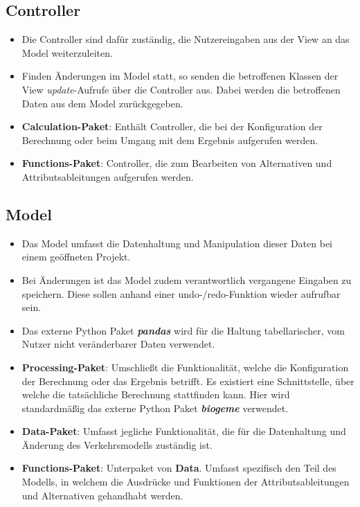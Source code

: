 \documentclass{article}
\begin{document}
\subsection{Controller}
\begin{itemize}
\item Die Controller sind dafür zuständig, die Nutzereingaben aus der View an das Model weiterzuleiten.
\item Finden Änderungen im Model statt, so senden die betroffenen Klassen der View \emph{update}-Aufrufe über die Controller aus. Dabei werden die betroffenen Daten aus dem Model zurückgegeben.
\item \textbf{Calculation-Paket}: Enthält Controller, die bei der Konfiguration der Berechnung oder beim Umgang mit dem Ergebnis aufgerufen werden.
\item \textbf{Functions-Paket}: Controller, die zum Bearbeiten von Alternativen und
Attributsableitungen aufgerufen werden.
\end{itemize}

\subsection{Model}
\begin{itemize}
\item Das Model umfasst die Datenhaltung und Manipulation dieser Daten bei einem geöffneten Projekt.
\item Bei Änderungen ist das Model zudem verantwortlich vergangene Eingaben zu speichern. Diese sollen anhand einer undo-/redo-Funktion wieder aufrufbar sein.
\item Das externe Python Paket \emph{\textbf{pandas}} wird für die Haltung tabellarischer, vom Nutzer nicht veränderbarer Daten verwendet.
\item \textbf{Processing-Paket}: Umschließt die Funktionalität, welche die Konfiguration der Berechnung oder das Ergebnis betrifft. Es existiert eine Schnittstelle, über welche die tatsächliche Berechnung stattfinden kann. Hier wird standardmäßig das externe Python Paket \emph{\textbf{biogeme}} verwendet.
\item \textbf{Data-Paket}: Umfasst jegliche Funktionalität, die für die Datenhaltung und Änderung des Verkehrsmodells zuständig ist.
\item \textbf{Functions-Paket}: Unterpaket von \textbf{Data}. Umfasst spezifisch den Teil des Modells, in welchem die Ausdrücke und Funktionen der Attributsableitungen und Alternativen gehandhabt werden.
\end{itemize}
\end{document}
